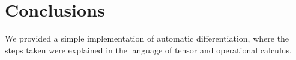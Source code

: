 \section{Conclusions}

We provided a simple implementation of automatic differentiation, where the steps taken were explained in the language of tensor and operational calculus.

